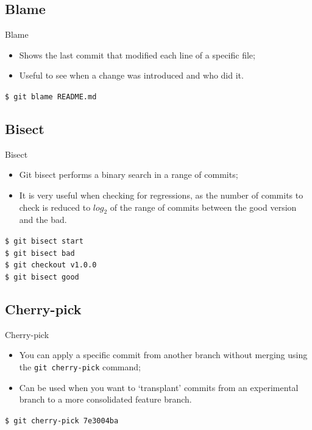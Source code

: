 \documentclass{beamer}
\begin{document}
\subsection{Blame}
\begin{frame}{Blame}
  \begin{itemize}
    \item Shows the last commit that modified each line of a specific file;
    \item Useful to see when a change was introduced and who did it.
  \end{itemize}
  \begin{block}{}
    \texttt{\$ git blame README.md}
  \end{block}
\end{frame}

\subsection{Bisect}
\begin{frame}{Bisect}
  \begin{itemize}
    \item Git bisect performs a binary search in a range of commits;
    \item It is very useful when checking for regressions, as the number of commits to check is reduced to $log_2$ of the range of commits between the good version and the bad.
  \end{itemize}
  \begin{block}{}
    \texttt{\$ git bisect start} \\
    \texttt{\$ git bisect bad} \\
    \texttt{\$ git checkout v1.0.0} \\
    \texttt{\$ git bisect good}
  \end{block}
\end{frame}

\subsection{Cherry-pick}
\begin{frame}{Cherry-pick}
  \begin{itemize}
    \item You can apply a specific commit from another branch without merging using the \texttt{git cherry-pick} command;
    \item Can be used when you want to `transplant' commits from an experimental branch to a more consolidated feature branch.
  \end{itemize}
  \begin{block}{}
    \texttt{\$ git cherry-pick 7e3004ba}
  \end{block}
\end{frame}
\end{document}
